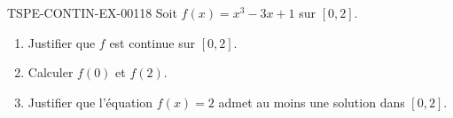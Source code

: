 \begin{exercice}{TSPE-CONTIN-EX-001}{1}{8}
Soit $f(x) = x^3 - 3x + 1$ sur $[0, 2]$.
\begin{enumerate}
  \item Justifier que $f$ est continue sur $[0, 2]$.
  \item Calculer $f(0)$ et $f(2)$.
  \item Justifier que l'équation $f(x) = 2$ admet au moins une solution dans $[0, 2]$.
\end{enumerate}
\end{exercice}
